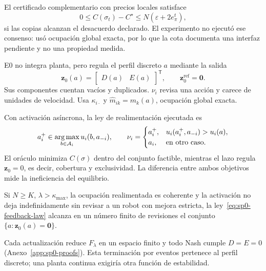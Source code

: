 El certificado complementario con precios locales satisface
\begin{equation}
 0\leq C(\sigma_t)-C^\star\leq N(\varepsilon+2e_\pi^t),
 \label{eq:sp0-local-price-gap}
\end{equation}
si las copias alcanzan el desacuerdo declarado. El experimento no ejecutó ese consenso: usó ocupación global exacta, por lo que la cota documenta una interfaz pendiente y no una propiedad medida.


\iffalse
E0 no integra planta, pero regula el perfil discreto $a$ mediante la salida
\begin{equation}
 \boldsymbol z_0(a)=
 \begin{bmatrix}D(a)&E(a)\end{bmatrix}^{\mathsf T},
 \qquad
 \boldsymbol z_0^{\mathrm{ref}}=\boldsymbol 0.
 \label{eq:sp0-strategic-regulation}
\end{equation}
Sus componentes cuentan vacíos y duplicados. $\nu_i$ revisa una acción y carece de unidades de velocidad. Usa $\kappa_{i\cdot}$ y $\widehat m_{ik}=m_k(a)$, ocupación global exacta.

Con activación asíncrona, la ley de realimentación ejecutada es
\begin{equation}
 a_i^+\in\operatorname*{arg\,max}_{b\in\mathcal A_i}u_i(b,a_{-i}),
 \qquad
 \nu_i=
 \begin{cases}
  a_i^+,&u_i(a_i^+,a_{-i})>u_i(a),\\
  a_i,&\text{en otro caso}.
 \end{cases}
 \label{eq:sp0-feedback-law}
\end{equation}
El oráculo minimiza \(C(\sigma)\) dentro del conjunto factible, mientras el lazo regula \(\boldsymbol z_0=0\), es decir, cobertura y exclusividad. La diferencia entre ambos objetivos mide la ineficiencia del equilibrio.

\begin{corolario}
\label{cor:sp0-strategic-regulation}
Si $N\geq K$, $\lambda>\kappa_{\max}$, la ocupación realimentada es coherente y la activación no deja indefinidamente sin revisar a un robot con mejora estricta, la ley~\eqref{eq:sp0-feedback-law} alcanza en un número finito de revisiones el conjunto $\{a:\boldsymbol z_0(a)=\boldsymbol0\}$.
\end{corolario}
Cada actualización reduce \(F_\lambda\) en un espacio finito y todo Nash cumple \(D=E=0\) (Anexo~\ref{app:sp0-proofs}). Esta terminación por eventos pertenece al perfil discreto; una planta continua exigiría otra función de estabilidad.

